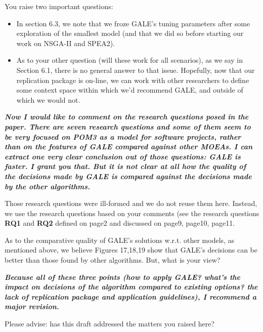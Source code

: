 \documentclass[10pt,journal,compsoc]{IEEEtran}
\newcommand{\bi}{\begin{itemize}}
\newcommand{\ei}{\end{itemize}}
\begin{document}
You raise two important questions:
\bi
\item In section 6.3, we note
that we froze GALE's tuning parameters after some exploration of the smallest model (and that we did
so before starting our work on NSGA-II and SPEA2).
\item As to your other question (will these work for all scenarios), as we say in Section 6.1,
there is no general answer to that issue. Hopefully, now that our replication package is on-line,
we can work with other researchers to define some context space within which we'd recommend
GALE, and outside of which we would not.
\ei

{\bf {\em Now I would like to comment on the
    research questions posed in the paper. There are
    seven research questions and some of them seem
    to be very focused on POM3 as a model for
    software projects, rather than on the features
    of GALE compared against other MOEAs. I can
    extract one very clear conclusion out of those
    questions: GALE is faster. I grant you that. But
    it is not clear at all how the quality of the
    decisions made by GALE is compared against the
    decisions made by the other algorithms.}}

Those research questions were ill-formed and we do not reuse them here.
Instead, we use the research questions based on your comments (see the research
questions {\bf RQ1} and {\bf RQ2} defined on page2 and discussed on 
page9, page10, page11.

As to the comparative quality of GALE's solutions w.r.t. other models,
as mentioned above, we believe Figures 17,18,19 show that GALE's
decisions can be better than those found by other algorithms. But, what is your view?


{\bf {\em Because all of these three points (how to apply GALE?
what's the impact on decisions of the algorithm compared to existing options?
the lack of replication package and application guidelines), I recommend a major revision.}}

Please advise: has this draft addressed the matters you raised here?
\end{document}

